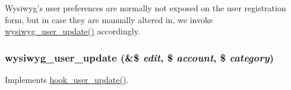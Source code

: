 Wysiwyg's user preferences are normally not exposed on the user registration form, but in case they are manually altered in, we invoke \hyperlink{wysiwyg_8module_aecc5eb4da6cc87d7a96613956215c80f}{wysiwyg\_\-user\_\-update()} accordingly. \hypertarget{wysiwyg_8module_aecc5eb4da6cc87d7a96613956215c80f}{
\subsubsection[{wysiwyg\_\-user\_\-update}]{\setlength{\rightskip}{0pt plus 5cm}wysiwyg\_\-user\_\-update (\&\$ {\em edit}, \/  \$ {\em account}, \/  \$ {\em category})}}
\label{wysiwyg_8module_aecc5eb4da6cc87d7a96613956215c80f}
Implements \hyperlink{group__hooks_gab71262402336071ef7c3d08f4c36e887}{hook\_\-user\_\-update()}. 